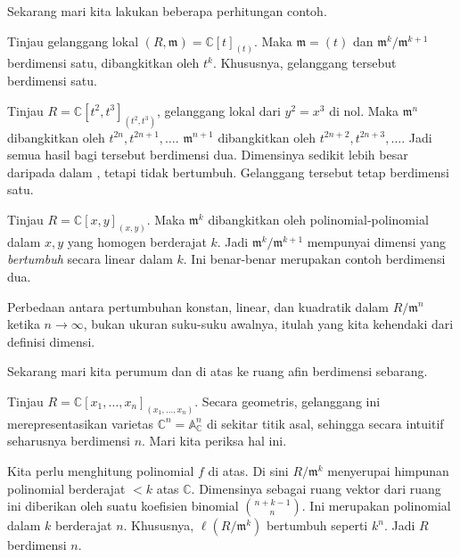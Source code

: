 Sekarang mari kita lakukan beberapa perhitungan contoh. 

\begin{example} \label{easydimcomputation}
\label{dimaffineline}
Tinjau gelanggang lokal $(R, \mathfrak{m}) = \mathbb{C}[t]_{(t)}$. Maka $\mathfrak{m} = (t)$ dan
$\mathfrak{m}^k/\mathfrak{m}^{k+1}$ berdimensi satu, dibangkitkan oleh $t^k$. Khususnya,
gelanggang tersebut berdimensi satu. 
\end{example} 

\begin{example} Tinjau $R = \mathbb{C}[t^2, t^3]_{(t^2, t^3)}$, gelanggang lokal dari $y^2 = x^3$
di nol. Maka $\mathfrak{m}^n$ dibangkitkan oleh $t^{2n}, t^{2n+1}, \dots$.
$\mathfrak{m}^{n+1}$ dibangkitkan oleh $t^{2n+2}, t^{2n+3}, \dots$. Jadi semua
hasil bagi tersebut berdimensi dua. Dimensinya sedikit
lebih besar daripada dalam , tetapi tidak bertumbuh. Gelanggang tersebut tetap berdimensi satu. 
\end{example} 

\begin{example} \label{dimaffineplane}
Tinjau $R = \mathbb{C}[x,y]_{(x,y)}$. Maka $\mathfrak{m}^k$ dibangkitkan oleh
polinomial-polinomial dalam $x,y$ yang homogen berderajat $k$. Jadi $\mathfrak{m}^k/\mathfrak{m}^{k+1}$
mempunyai dimensi yang \emph{bertumbuh} secara linear dalam $k$. Ini benar-benar merupakan contoh
berdimensi dua. 
\end{example} 

Perbedaan antara pertumbuhan konstan, linear, dan kuadratik dalam
$R/\mathfrak{m}^n$ ketika $n \to \infty$, bukan ukuran suku-suku awalnya,
itulah yang kita kehendaki dari definisi dimensi.

Sekarang mari kita perumum  dan 
di atas ke ruang afin berdimensi sebarang. 
\begin{example} 
Tinjau $R = \mathbb{C}[x_1, \dots, x_n]_{(x_1, \dots, x_n)}$. 
Secara geometris, gelanggang ini merepresentasikan varietas $\mathbb{C}^n = \mathbb{A}^n_{\mathbb{C}}$ di sekitar titik asal, sehingga
secara intuitif seharusnya berdimensi $n$. Mari kita periksa hal ini. 

Kita perlu menghitung polinomial $f$ di atas. Di sini $R/\mathfrak{m}^k$ menyerupai himpunan
polinomial berderajat $<k$ atas $\mathbb{C}$. Dimensinya sebagai ruang vektor
dari ruang ini
diberikan oleh suatu koefisien binomial $\binom{n+k-1}{n}$. Ini merupakan polinomial dalam
$k$ berderajat $n$. Khususnya, $\ell(R/\mathfrak{m}^k)$ bertumbuh seperti $k^n$.
Jadi $R$ berdimensi $n$. 
\end{example} 


